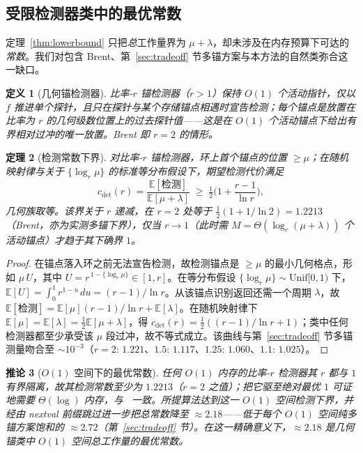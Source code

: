 \documentclass[11pt]{ctexart}
\newtheorem{theorem}{定理}[section]
\newtheorem{corollary}[theorem]{推论}
\newtheorem{definition}[theorem]{定义}
\begin{document}
\subsection{受限检测器类中的最优常数}
\label{sec:restricted-lb}

定理~\ref{thm:lowerbound} 只把\emph{总}工作量界为 $\mu+\lambda$，却未涉及在内存预算下可达的\emph{常数}。我们对包含 Brent、第~\ref{sec:tradeoff} 节多锚方案与本方法的自然类弥合这一缺口。

\begin{definition}[几何锚检测器]
\label{def:geom-anchor}
\emph{比率-$r$ 锚检测器}（$r>1$）保持 $O(1)$ 个活动指针，仅以 $f$ 推进单个探针，且只在探针与某个存储\emph{锚点}相遇时宣告检测；每个锚点是放置在比率为 $r$ 的几何级数位置上的过去探针值——这是在 $O(1)$ 个活动锚点下给出有界相对过冲的唯一放置。Brent 即 $r=2$ 的情形。
\end{definition}

\begin{theorem}[检测常数下界]
\label{thm:restricted-lb}
对比率-$r$ 锚检测器，环上首个锚点的位置 $\ge\mu$；在随机映射律与关于 $\{\log_r\mu\}$ 的标准等分布假设下，期望检测代价满足
\[
c_{\det}(r)=\frac{\mathbb E[检测]}{\mathbb E[\mu+\lambda]}\;\ge\;\tfrac12\Big(1+\frac{r-1}{\ln r}\Big),
\]
几何族取等。该界关于 $r$ 递减，在 $r=2$ 处等于 $\tfrac12(1+1/\ln2)=1.2213$（Brent，亦为实测多锚下界），仅当 $r\to1$（此时需 $M=\Theta(\log_r(\mu+\lambda))$ 个活动锚点）才趋于其下确界 $1$。
\end{theorem}

\begin{proof}
在锚点落入环之前无法宣告检测，故检测锚点是 $\ge\mu$ 的最小几何格点，形如 $\mu\,U$，其中 $U=r^{\,1-\{\log_r\mu\}}\in[1,r]$。在等分布假设 $\{\log_r\mu\}\sim\mathrm{Unif}[0,1)$ 下，$\mathbb E[U]=\int_0^1 r^{1-u}\,du=(r-1)/\ln r$。从该锚点识别返回还需一个周期 $\lambda$，故 $\mathbb E[检测]=\mathbb E[\mu](r-1)/\ln r+\mathbb E[\lambda]$。在随机映射律下 $\mathbb E[\mu]=\mathbb E[\lambda]=\tfrac12\mathbb E[\mu+\lambda]$，得 $c_{\det}(r)=\tfrac12((r-1)/\ln r+1)$；类中任何检测器都至少承受该 $\mu$ 段过冲，故不等式成立。该曲线与第~\ref{sec:tradeoff} 节多锚测量吻合至 $\sim10^{-3}$（$r{=}2{:}\,1.221$、$1.5{:}\,1.117$、$1.25{:}\,1.060$、$1.1{:}\,1.025$）。
\end{proof}

\begin{corollary}[$O(1)$ 空间下的最优常数]
\label{cor:o1-optimal}
任何 $O(1)$ 内存的比率-$r$ 检测器其 $r$ 都与 $1$ 有界隔离，故其检测常数至少为 $1.2213$（$r=2$ 之值）；把它驱至绝对最优 $1$ 可证地需要 $\Theta(\log)$ 内存，与~\cite{ssy1982} 一致。所提算法达到这一 $O(1)$ 空间检测下界，并经由 nextval 前缀跳过进一步把\emph{总}常数降至 $\approx2.18$——低于每个 $O(1)$ 空间纯多锚方案饱和的 $\approx2.72$（第~\ref{sec:tradeoff} 节）。在这一精确意义下，$\approx2.18$ 是几何锚类中 $O(1)$ 空间总工作量的最优常数。
\end{corollary}
\end{document}
